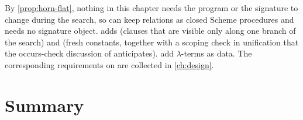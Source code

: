 \begin{kanren}
By \cref{prop:horn-flat}, nothing in this chapter needs the program or the signature to change during
the search, so \micro{} can keep relations as closed Scheme procedures and needs no signature object.
 adds  (clauses that are visible only along one branch of the search) and
 (fresh constants, together with a scoping check in unification that the occurs-check
discussion of  anticipates).  add $\lambda$-terms as data. The
corresponding requirements on \micro{} are collected in \cref{ch:design}.
\end{kanren}

\section{Summary}\label{sec:horn-summary}
